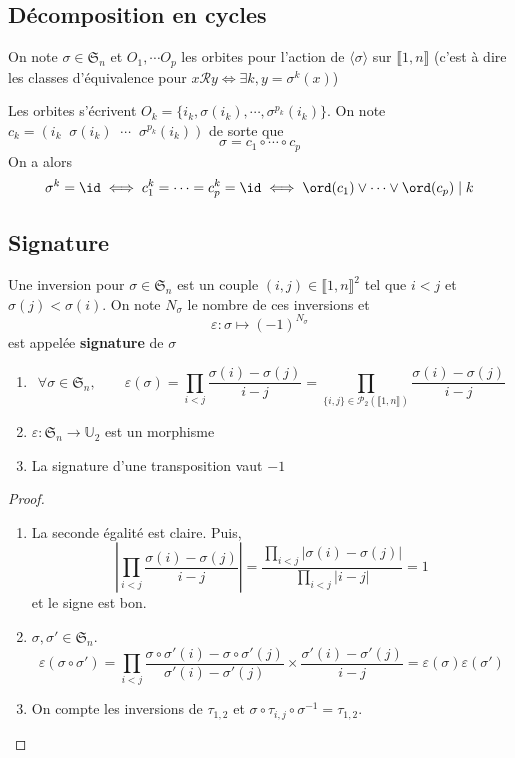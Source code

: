 \subsection{Décomposition en cycles}

On note $\sigma \in\mathfrak S_n$ et $O_1, \cdots O_p$ les orbites pour l'action de $\langle \sigma \rangle$ sur $\llbracket1, n\rrbracket$ (c'est à dire les classes d'équivalence pour $x\mathcal Ry\iff \exists k, y=\sigma^k(x)$)

Les orbites s'écrivent $O_k=\{i_k, \sigma(i_k), \cdots, \sigma^{p_k}(i_k)\}$. On note $c_k=(i_k\;\;\sigma(i_k)\;\;\cdots\;\;\sigma^{p_k}(i_k))$ de sorte que \[
    \sigma=c_1\circ \cdots \circ c_p
\]
On a alors \[
    \sigma^k=\id \iff c_1^k=\cdots =c_p^k=\id \iff \ord(c_1)\lor \cdots \lor \ord(c_p)\;|\;k
\]

\subsection{Signature}

Une inversion pour $\sigma \in \mathfrak S_n$ est un couple $(i, j)\in\llbracket 1, n\rrbracket^2$ tel que $i<j$ et $\sigma(j)<\sigma(i)$. On note $N_\sigma$ le nombre de ces inversions et \[
    \varepsilon: \sigma\longmapsto (-1)^{N_\sigma}
\]
est appelée \textbf{signature} de $\sigma$

\begin{prop}
    \begin{enumerate}
        \item \[
                \forall \sigma\in\mathfrak S_n, \qquad \varepsilon(\sigma)=\prod_{i<j}\frac{\sigma(i)-\sigma(j)}{i-j}=\prod_{\{i, j\}\in \mathcal P_2(\llbracket 1, n\rrbracket)}\frac{\sigma(i)-\sigma(j)}{i-j}
            \]
        \item $\varepsilon:\mathfrak S_n\to \mathbb U_2$ est un morphisme
        \item La signature d'une transposition vaut $-1$
    \end{enumerate}
\end{prop}

\begin{proof}~
    \begin{enumerate}
        \item La seconde égalité est claire. Puis, \[
                \left| \prod_{i<j}\frac{\sigma(i)-\sigma(j)}{i-j} \right|=\frac{\prod_{i<j}|\sigma(i)-\sigma(j)|}{\prod_{i<j}|i-j|}=1
            \]
            et le signe est bon.
        \item $\sigma, \sigma'\in\mathfrak S_n$. \[
                \varepsilon(\sigma \circ \sigma')=\prod_{i<j}\frac{\sigma\circ \sigma'(i)-\sigma\circ \sigma'(j)}{\sigma'(i)-\sigma'(j)}\times \frac{\sigma'(i)-\sigma'(j)}{i-j}=\varepsilon(\sigma)\varepsilon(\sigma')
            \]
        \item On compte les inversions de $\tau_{1, 2}$ et $\sigma\circ \tau_{i, j}\circ \sigma^{-1}=\tau_{1, 2}$.
    \end{enumerate}
\end{proof}

